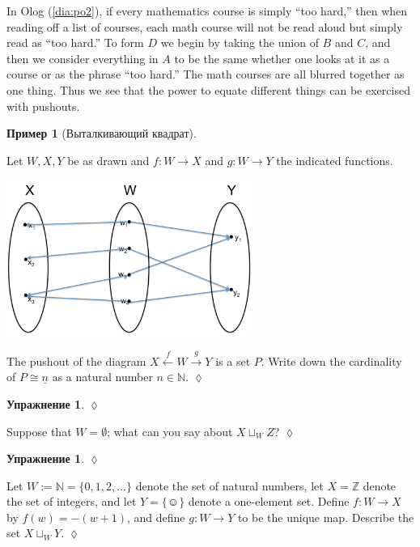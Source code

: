 \documentclass[a4paper]{book}
\def\ZZ{{\mathbb Z}}
\def\NN{{\mathbb N}}
\def\singleton{\{\smiley\}}
\def\to{\rightarrow}
\def\taking{\colon}
\def\iso{\cong}
\def\ul{\underline}
\newcommand{\Too}[1]{\xrightarrow{\ \ #1\ \ }}
\newcommand{\Fromm}[1]{\xleftarrow{\ \ #1\ \ }}
\theoremstyle{myth}
\newtheorem{exampleENG}[envENG]{\begin{english}Example\end{english}}
\newtheorem{excENG}[envENG]{\begin{english}Exercise\end{english}}
\newenvironment{exerciseENG}{\begin{excENG}}{\hspace*{\fill}$\lozenge$\end{excENG}}
\newtheorem{exampleRUS}[envRUS]{Пример}
\newtheorem{excRUS}[envRUS]{Упражнение}
\newenvironment{exerciseRUS}{\begin{excRUS}}{\hspace*{\fill}$\lozenge$\end{excRUS}}
\begin{document}
\begin{russian}
\begin{exampleENG}[Pushout]
In Olog (\ref{dia:po2}), if every mathematics course is simply “too hard,” then when reading off a list of courses, each math course will not be read aloud but simply read as “too hard.”  To form $D$ we begin by taking the union of $B$ and $C$, and then we consider everything in $A$ to be the same whether one looks at it as a course or as the phrase “too hard.”  The math courses are all blurred together as one thing.  Thus we see that the power to equate different things can be exercised with pushouts.
\end{exampleENG}

\begin{exampleRUS}[Выталкивающий квадрат]\label{ex:pushout}
 
\end{exampleRUS}

\begin{exerciseENG}
Let $W,X,Y$ be as drawn and $f\taking W\to X$ and $g\taking W\to Y$ the indicated functions. 
\begin{center}
\includegraphics[height=2in]{setPushout}
\end{center}
The pushout of the diagram $X\Fromm{f}W\Too{g}Y$ is a set $P$. Write down the cardinality of $P\iso\ul{n}$ as a natural number $n\in\NN$.  
\end{exerciseENG}

\begin{exerciseRUS}
 
\end{exerciseRUS}

\begin{exerciseENG}
Suppose that $W=\emptyset$; what can you say about $X\sqcup_WZ$? 
\end{exerciseENG}

\begin{exerciseRUS}
 
\end{exerciseRUS}

\begin{exerciseENG}
Let $W:=\NN=\{0,1,2,\ldots\}$ denote the set of natural numbers, let $X=\ZZ$ denote the set of integers, and let $Y=\singleton$ denote a one-element set. Define $f\taking W\to X$ by $f(w)= -(w+1)$, and define $g\taking W\to Y$ to be the unique map. Describe the set $X\sqcup_WY$.
\end{exerciseENG}


\end{russian}
\end{document}
